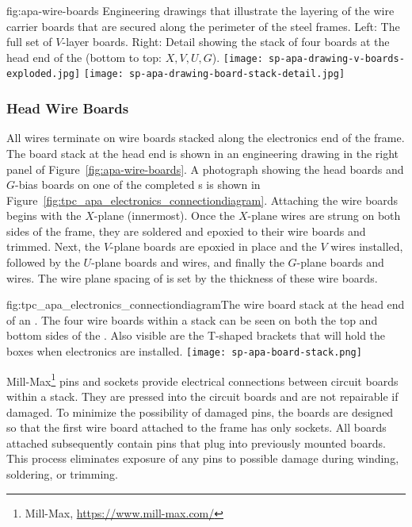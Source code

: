 \begin{dunefigure}{fig:apa-wire-boards}
{Engineering drawings that illustrate the layering of the wire carrier boards that are secured along the perimeter of the  steel frames. Left: The full set of $V$-layer boards.  Right: Detail showing the stack of four boards at the head end of the  (bottom to top: $X,V,U,G$).}
\texttt{[image: sp-apa-drawing-v-boards-exploded.jpg]}
\texttt{[image: sp-apa-drawing-board-stack-detail.jpg]}
\end{dunefigure}


\subsubsection{Head Wire Boards}
\label{sec:fdsp-apa-headboards}

All  wires terminate on wire boards stacked along the electronics end of the  frame.  The board stack at the head end is shown in an engineering drawing in the right panel of Figure~\ref{fig:apa-wire-boards}. A photograph showing the head boards and $G$-bias boards on one of the completed  s is shown in Figure~\ref{fig:tpc_apa_electronics_connectiondiagram}. Attaching the wire boards begins with the $X$-plane (innermost). Once the $X$-plane wires are strung on both sides of the  frame, they are soldered and epoxied to their wire boards and trimmed. Next, the $V$-plane boards are epoxied in place and the $V$ wires installed, followed by the $U$-plane boards and wires, and finally the $G$-plane boards and wires. The wire plane spacing of \planespace %
is set by the thickness of these wire boards.   

\begin{dunefigure}{fig:tpc_apa_electronics_connectiondiagram}{The wire board stack at the head end of an . The four wire boards within a stack can be seen on both the top and bottom sides of the .  Also visible are the T-shaped brackets that will hold the  boxes when electronics are installed.   
}
\texttt{[image: sp-apa-board-stack.png]}
\end{dunefigure} 

Mill-Max\footnote{Mill-Max\texttrademark{}, \url{https://www.mill-max.com/}} pins and sockets provide electrical connections between circuit boards within a stack. They are pressed into the circuit boards and are not repairable if damaged. To minimize the possibility of damaged pins, the boards are designed so that the first wire board attached to the frame has only sockets. All boards attached subsequently contain pins that plug into previously mounted boards. This process eliminates exposure of any pins to possible damage during winding, soldering, or trimming.

